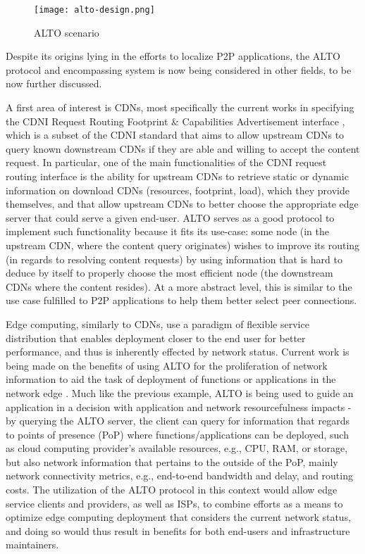     \begin{figure}[!h]
    \centering
    \texttt{[image: alto-design.png]}
    \caption{ALTO scenario \cite{seedorf2009}}
    \label{fig:alto-design}
    \end{figure}

        Despite its origins lying in the efforts to localize P2P applications, the ALTO protocol and encompassing system is now being considered in other fields, to be now further discussed.

        A first area of interest is CDNs, most specifically the current works in specifying the CDNI Request Routing Footprint \& Capabilities Advertisement interface \cite{alto-cdni(draft)}, which is a subset of the CDNI standard \cite{cdni-problem-statement} that aims to allow upstream CDNs to query known downstream CDNs if they are able and willing to accept the content request.
        In particular, one of the main functionalities of the CDNI request routing interface is the ability for upstream CDNs to retrieve static or dynamic information on download CDNs (resources, footprint, load), which they provide themselves, and that allow upstream CDNs to better choose the appropriate edge server that could serve a given end-user.
        ALTO serves as a good protocol to implement such functionality because it fits its use-case: some node (in the upstream CDN, where the content query originates) wishes to improve its routing (in regards to resolving content requests) by using information that is hard to deduce by itself to properly choose the most efficient node (the downstream CDNs where the content resides).
        At a more abstract level, this is similar to the use case fulfilled to P2P applications to help them better select peer connections.

        Edge computing, similarly to CDNs, use a paradigm of flexible service distribution that enables deployment closer to the end user for better performance, and thus is inherently effected by network status.
        Current work is being made on the benefits of using ALTO for the proliferation of network information to aid the task of deployment of functions or applications in the network edge \cite{alto-determining-service-edge(draft)}.
        Much like the previous example, ALTO is being used to guide an application in a decision with application and network resourcefulness impacts - by querying the ALTO server, the client can query for information that regards to points of presence (PoP) where functions/applications can be deployed, such as cloud computing provider's available resources, e.g., CPU, RAM, or storage, but also network information that pertains to the outside of the PoP, mainly network connectivity metrics, e.g., end-to-end bandwidth and delay, and routing costs.
        The utilization of the ALTO protocol in this context would allow edge service clients and providers, as well as ISPs, to combine efforts as a means to optimize edge computing deployment that considers the current network status, and doing so would thus result in benefits for both end-users and infrastructure maintainers.

